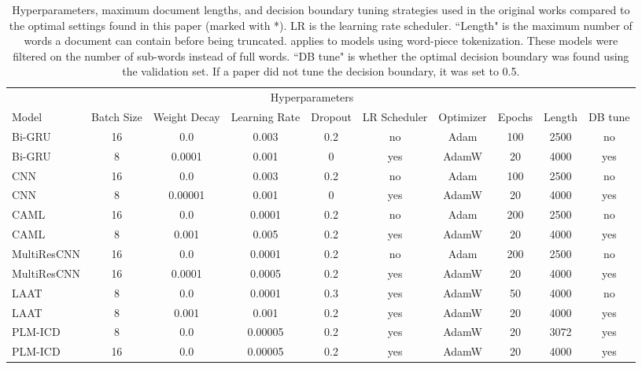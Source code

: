 \documentclass[anonymous=false, sigconf=true, review=false, natbib=true]{acmart}
\begin{document}
\begin{table*}[t]
    \centering
    \caption{Hyperparameters, maximum document lengths, and decision boundary tuning strategies used in the original works compared to the optimal settings found in this paper (marked with *). LR is the learning rate scheduler. ``Length" is the maximum number of words a document can contain before being truncated.  applies to models using word-piece tokenization. These models were filtered on the number of sub-words instead of full words. ``DB tune" is whether the optimal decision boundary was found using the validation set. If a paper did not tune the decision boundary, it was set to 0.5.}
    \label{tab:hyperparameters}
    \begin{tabular}{lccccccccc}
        \toprule
        & \multicolumn{7}{c}{Hyperparameters} & & \\
        \cmidrule(lr){2-8}
        Model & Batch Size & Weight Decay & Learning Rate & Dropout & LR Scheduler & Optimizer & Epochs & Length & DB tune \\
        \midrule
        Bi-GRU  & 16 &  0.0 & 0.003 &  0.2   & no  & Adam &  100 & 2500 & no\\
        Bi-GRU  & 8 &  0.0001 & 0.001 &  0   & yes  & AdamW &  20 & 4000 & yes\\
        \hline
        CNN  & 16 &  0.0 & 0.003  &  0.2 & no  & Adam &  100 & 2500 & no\\
        CNN    & 8 &  0.00001 & 0.001  &  0 & yes  & AdamW &  20 & 4000 & yes \\
        \hline
        CAML  & 16 &  0.0 & 0.0001  &  0.2  & no  & Adam  &  200 & 2500 & no\\
        CAML    & 8 &  0.001 & 0.005  &  0.2  & yes  & AdamW  &  20 & 4000 & yes\\
        \hline
        MultiResCNN & 16 &  0.0 & 0.0001  &  0.2  & no  & Adam &  200 & 2500 & no\\
        MultiResCNN  & 16 &  0.0001 & 0.0005  &  0.2  & yes  & AdamW &  20 & 4000 & yes\\
        \hline
        LAAT   & 8 &  0.0 & 0.0001  &  0.3  & yes  & AdamW &  50 & 4000 & no\\
        LAAT    & 8 &  0.001 & 0.001  &  0.2  & yes  & AdamW &  20 & 4000 & yes\\
        \hline
        PLM-ICD  & 8 &  0.0 & 0.00005  &  0.2  & yes  & AdamW &  20 & 3072 & yes \\
        PLM-ICD   & 16 &  0.0 & 0.00005  &  0.2  & yes  & AdamW &  20 & 4000 & yes \\
        \bottomrule
    \end{tabular}
\end{table*}
\end{document}
